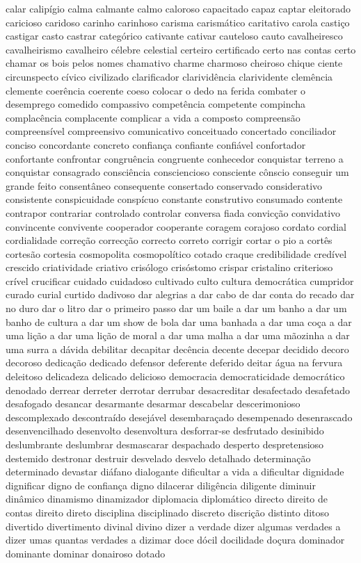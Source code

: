 calar calip\'{i}gio calma calmante calmo caloroso capacitado capaz captar eleitorado caricioso caridoso carinho carinhoso carisma carism\'{a}tico caritativo carola casti\c{c}o castigar casto castrar categ\'{o}rico cativante cativar cauteloso cauto cavalheiresco cavalheirismo cavalheiro c\'{e}lebre celestial certeiro certificado certo nas contas certo chamar os bois pelos nomes chamativo charme charmoso cheiroso chique ciente circunspecto c\'{i}vico civilizado clarificador clarivid\^{e}ncia clarividente clem\^{e}ncia clemente coer\^{e}ncia coerente coeso colocar o dedo na ferida combater o desemprego comedido compassivo compet\^{e}ncia competente compincha complac\^{e}ncia complacente complicar a vida a composto compreens\~ao compreens\'{i}vel compreensivo comunicativo conceituado concertado conciliador conciso concordante concreto confian\c{c}a confiante confi\'{a}vel confortador confortante confrontar congru\^{e}ncia congruente conhecedor conquistar terreno a conquistar consagrado consci\^{e}ncia consciencioso consciente c\^{o}nscio conseguir um grande feito consent\^{a}neo consequente consertado conservado considerativo consistente conspicuidade consp\'{i}cuo constante construtivo consumado contente contrapor contrariar controlado controlar conversa fiada convic\c{c}\~ao convidativo convincente convivente cooperador cooperante coragem corajoso cordato cordial cordialidade corre\c{c}\~ao correc\c{c}\~ao correcto correto corrigir cortar o pio a cort\^{e}s cortes\~ao cortesia cosmopolita cosmopol\'{i}tico cotado craque credibilidade cred\'{i}vel crescido criatividade criativo cris\'{o}logo cris\'{o}stomo crispar cristalino criterioso cr\'{i}vel crucificar cuidado cuidadoso cultivado culto cultura democr\'{a}tica cumpridor curado curial curtido dadivoso dar alegrias a dar cabo de dar conta do recado dar no duro dar o litro dar o primeiro passo dar um baile a dar um banho a dar um banho de cultura a dar um show de bola dar uma banhada a dar uma co\c{c}a a dar uma li\c{c}\~ao a dar uma li\c{c}\~ao de moral a dar uma malha a dar uma m\~aozinha a dar uma surra a d\'{a}vida debilitar decapitar dec\^{e}ncia decente decepar decidido decoro decoroso dedica\c{c}\~ao dedicado defensor deferente deferido deitar \'{a}gua na fervura deleitoso delicadeza delicado delicioso democracia democraticidade democr\'{a}tico denodado derrear derreter derrotar derrubar desacreditar desafectado desafetado desafogado desancar desarmante desarmar descabelar descerimonioso descomplexado descontra\'{i}do desej\'{a}vel desembara\c{c}ado desempenado desenrascado desenvencilhado desenvolto desenvoltura desforrar-se desfrutado desinibido deslumbrante deslumbrar desmascarar despachado desperto despretensioso destemido destronar destruir desvelado desvelo detalhado determina\c{c}\~ao determinado devastar di\'{a}fano dialogante dificultar a vida a dificultar dignidade dignificar digno de confian\c{c}a digno dilacerar dilig\^{e}ncia diligente diminuir din\^{a}mico dinamismo dinamizador diplomacia diplom\'{a}tico directo direito de contas direito direto disciplina disciplinado discreto discri\c{c}\~ao distinto ditoso divertido divertimento divinal divino dizer a verdade dizer algumas verdades a dizer umas quantas verdades a dizimar doce d\'{o}cil docilidade do\c{c}ura dominador dominante dominar donairoso dotado 